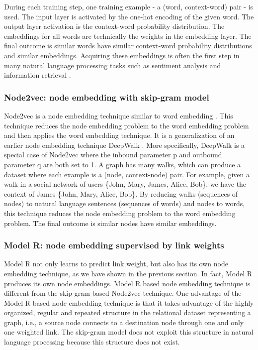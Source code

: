 \documentclass{article} %
\begin{document}
During each training step, one training example - a (word, context-word) pair - is used.
The input layer is activated by the one-hot encoding of the given word.
The output layer activation is the context-word probability distribution.
The embeddings for all words are technically the weights in the embedding layer.
The final outcome is similar words have similar context-word probability distributions and similar embeddings.
Acquiring these embeddings is often the first step in many natural language processing tasks such as sentiment analysis \citep{socher2013recursive} and
information retrieval \citep{shen2014latent}.

\subsubsection{Node2vec: node embedding with skip-gram model}
Node2vec is a node embedding technique similar to word embedding \citep{grover2016node2vec}.
This technique reduces the node embedding problem to the word embedding problem and then applies the word embedding technique.
It is a generalization of an earlier node embedding technique DeepWalk \citep{perozzi2014deepwalk}.
More specifically, DeepWalk is a special case of Node2vec where the inbound parameter p and outbound parameter q are both set to 1.
A graph has many walks, which can produce a dataset where each example is a (node, context-node) pair.
For example, given a walk in a social network of users \{John, Mary, James, Alice, Bob\}, we have the context of James \{John, Mary, Alice, Bob\}.
By reducing walks (sequences of nodes) to natural language sentences (sequences of words) and nodes to words,
this technique reduces the node embedding problem to the word embedding problem.
The final outcome is similar nodes have similar embeddings.

\subsubsection{Model R: node embedding supervised by link weights}
Model R not only learns to predict link weight,
but also has its own node embedding technique,
as we have shown in the previous section.
In fact, Model R produces its own node embeddings.
Model R based node embedding technique is different from the skip-gram based Node2vec technique.
One advantage of the Model R based node embedding technique is that it takes advantage of the highly organized, regular and repeated structure in the relational dataset representing a graph, i.e., a source node connects to a destination node through one and only one weighted link.
The skip-gram model does not exploit this structure in natural language processing because this structure does not exist.
\end{document}

